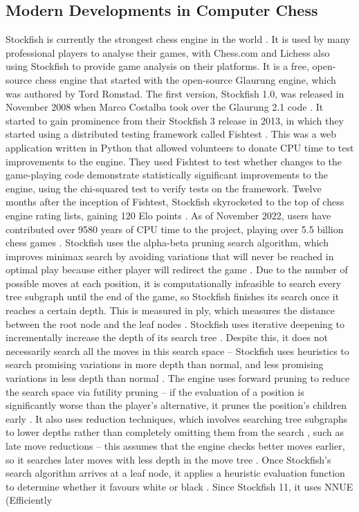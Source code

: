 \documentclass[%
 superscriptaddress,
showpacs,preprintnumbers,
 amsmath,
 amssymb,
 aps,
 pra,
showkeys,
onecolumn,
notitlepage,
11pt,
tightenlines      %
]{revtex4-1}
\begin{document}
\subsection{Modern Developments in Computer Chess}
Stockfish is currently the strongest chess engine in the world \cite{computerChessRatingLists}. It is used by many professional players to analyse their games, with Chess.com and Lichess also using Stockfish to provide game analysis on their platforms. It is a free, open-source chess engine that started with the open-source Glaurung engine, which was authored by Tord Romstad. The first version, Stockfish 1.0, was released in November 2008 when Marco Costalba took over the Glaurung 2.1 code \cite{aboutStockfish}. It started to gain prominence from their Stockfish 3 release in 2013, in which they started using a distributed testing framework called Fishtest \cite{fishtestDistributedTestingFramework}. This was a web application written in Python that allowed volunteers to donate CPU time to test improvements to the engine. They used Fishtest to test whether changes to the game-playing code demonstrate statistically significant improvements to the engine, using the chi-squared test to verify tests on the framework. Twelve months after the inception of Fishtest, Stockfish skyrocketed to the top of chess engine rating lists, gaining 120 Elo points \cite{stockfishRatingsAfterFishtest}. As of November 2022, users have contributed over 9580 years of CPU time to the project, playing over 5.5 billion chess games \cite{fishtestUsers}. Stockfish uses the alpha-beta pruning search algorithm, which improves minimax search \cite{v1928theorie} by avoiding variations that will never be reached in optimal play because either player will redirect the game \cite{maharaj2022chess}. Due to the number of possible moves at each position, it is computationally infeasible to search every tree subgraph until the end of the game, so Stockfish finishes its search once it reaches a certain depth. This is measured in ply, which measures the distance between the root node and the leaf nodes \cite{maharaj2022chess}. Stockfish uses iterative deepening to incrementally increase the depth of its search tree \cite{de2014thought}. Despite this, it does not necessarily search all the moves in this search space -- Stockfish uses heuristics to search promising variations in more depth than normal, and less promising variations in less depth than normal \cite{maharaj2022chess}. The engine uses forward pruning to reduce the search space via futility pruning -- if the evaluation of a position is significantly worse than the player's alternative, it prunes the position's children early \cite{maharaj2022chess}. It also uses reduction techniques, which involves searching tree subgraphs to lower depths rather than completely omitting them from the search \cite{maharaj2022chess}, such as late move reductions -- this assumes that the engine checks better moves earlier, so it searches later moves with less depth in the move tree \cite{levy1989sex}. Once Stockfish's search algorithm arrives at a leaf node, it applies a heuristic evaluation function to determine whether it favours white or black \cite{maharaj2022chess}. Since Stockfish 11, it uses NNUE (Efficiently 
\end{document}
